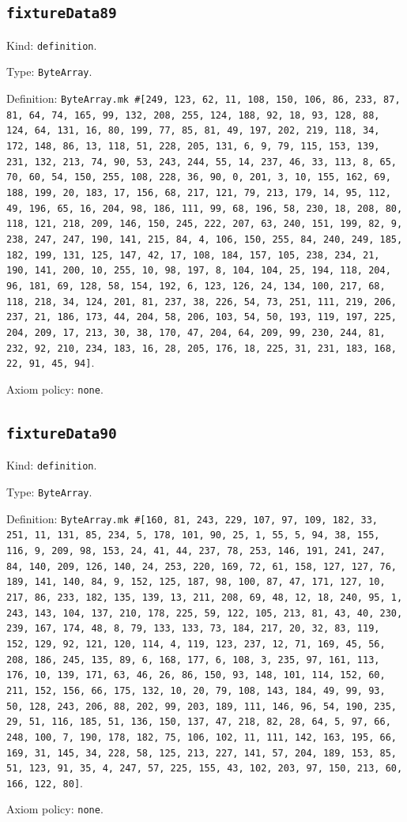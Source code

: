 \documentclass[11pt]{article}
\begin{document}
\subsection*{\texttt{fixtureData89}}
\noindent Kind: \texttt{definition}.\par
\noindent Type: \texttt{ByteArray}.\par
\noindent Definition: \texttt{ByteArray.mk \#[249, 123, 62, 11, 108, 150, 106, 86, 233, 87, 81, 64, 74, 165, 99, 132, 208, 255, 124, 188, 92, 18, 93, 128, 88, 124, 64, 131, 16, 80, 199, 77, 85, 81, 49, 197, 202, 219, 118, 34, 172, 148, 86, 13, 118, 51, 228, 205, 131, 6, 9, 79, 115, 153, 139, 231, 132, 213, 74, 90, 53, 243, 244, 55, 14, 237, 46, 33, 113, 8, 65, 70, 60, 54, 150, 255, 108, 228, 36, 90, 0, 201, 3, 10, 155, 162, 69, 188, 199, 20, 183, 17, 156, 68, 217, 121, 79, 213, 179, 14, 95, 112, 49, 196, 65, 16, 204, 98, 186, 111, 99, 68, 196, 58, 230, 18, 208, 80, 118, 121, 218, 209, 146, 150, 245, 222, 207, 63, 240, 151, 199, 82, 9, 238, 247, 247, 190, 141, 215, 84, 4, 106, 150, 255, 84, 240, 249, 185, 182, 199, 131, 125, 147, 42, 17, 108, 184, 157, 105, 238, 234, 21, 190, 141, 200, 10, 255, 10, 98, 197, 8, 104, 104, 25, 194, 118, 204, 96, 181, 69, 128, 58, 154, 192, 6, 123, 126, 24, 134, 100, 217, 68, 118, 218, 34, 124, 201, 81, 237, 38, 226, 54, 73, 251, 111, 219, 206, 237, 21, 186, 173, 44, 204, 58, 206, 103, 54, 50, 193, 119, 197, 225, 204, 209, 17, 213, 30, 38, 170, 47, 204, 64, 209, 99, 230, 244, 81, 232, 92, 210, 234, 183, 16, 28, 205, 176, 18, 225, 31, 231, 183, 168, 22, 91, 45, 94]}.\par
\noindent Axiom policy: \texttt{none}.\par
\subsection*{\texttt{fixtureData90}}
\noindent Kind: \texttt{definition}.\par
\noindent Type: \texttt{ByteArray}.\par
\noindent Definition: \texttt{ByteArray.mk \#[160, 81, 243, 229, 107, 97, 109, 182, 33, 251, 11, 131, 85, 234, 5, 178, 101, 90, 25, 1, 55, 5, 94, 38, 155, 116, 9, 209, 98, 153, 24, 41, 44, 237, 78, 253, 146, 191, 241, 247, 84, 140, 209, 126, 140, 24, 253, 220, 169, 72, 61, 158, 127, 127, 76, 189, 141, 140, 84, 9, 152, 125, 187, 98, 100, 87, 47, 171, 127, 10, 217, 86, 233, 182, 135, 139, 13, 211, 208, 69, 48, 12, 18, 240, 95, 1, 243, 143, 104, 137, 210, 178, 225, 59, 122, 105, 213, 81, 43, 40, 230, 239, 167, 174, 48, 8, 79, 133, 133, 73, 184, 217, 20, 32, 83, 119, 152, 129, 92, 121, 120, 114, 4, 119, 123, 237, 12, 71, 169, 45, 56, 208, 186, 245, 135, 89, 6, 168, 177, 6, 108, 3, 235, 97, 161, 113, 176, 10, 139, 171, 63, 46, 26, 86, 150, 93, 148, 101, 114, 152, 60, 211, 152, 156, 66, 175, 132, 10, 20, 79, 108, 143, 184, 49, 99, 93, 50, 128, 243, 206, 88, 202, 99, 203, 189, 111, 146, 96, 54, 190, 235, 29, 51, 116, 185, 51, 136, 150, 137, 47, 218, 82, 28, 64, 5, 97, 66, 248, 100, 7, 190, 178, 182, 75, 106, 102, 11, 111, 142, 163, 195, 66, 169, 31, 145, 34, 228, 58, 125, 213, 227, 141, 57, 204, 189, 153, 85, 51, 123, 91, 35, 4, 247, 57, 225, 155, 43, 102, 203, 97, 150, 213, 60, 166, 122, 80]}.\par
\noindent Axiom policy: \texttt{none}.\par
\end{document}
